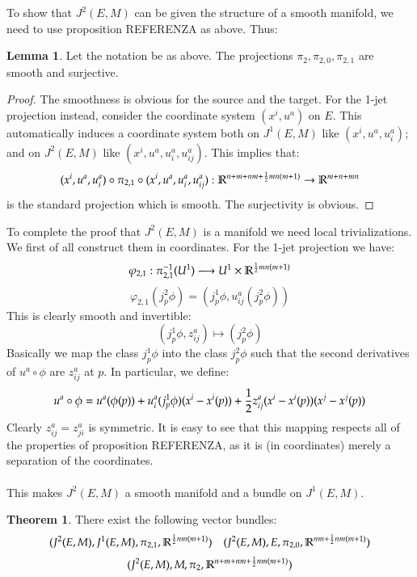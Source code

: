 \documentclass[12pt,a4paper]{report}
\theoremstyle{definition}
\theoremstyle{Theorem}
\newtheorem{Theo}[Def]{Theorem}
\newtheorem{Lm}[Def]{Lemma}
\theoremstyle{break}
\theoremstyle{definition}
\begin{document}
	To show that $J^2(E,M)$ can be given the structure of a smooth manifold, we need to use proposition REFERENZA as above. Thus:
	\begin{Lm}
		Let the notation be as above. The projections $\pi_2,\pi_{2,0},\pi_{2,1}$ are smooth and surjective.
	\end{Lm}
	\begin{proof}
		The smoothness is obvious for the source and the target. For the 1-jet projection instead, consider the coordinate system $(x^i,u^a)$ on $E$. This automatically induces a coordinate system both on $J^1(E,M)$ like $(x^i,u^a,u^a_i)$; and on $J^2(E,M)$ like $(x^i,u^a,u^a_i,u^a_{ij})$. This implies that:
		$$(x^i,u^a,u^a_i)\circ \pi_{2,1}\circ (x^i,u^a,u^a_i,u^a_{ij}):\mathbb{R}^{n+m+nm+{1\over 2}mn(m+1)}\rightarrow\mathbb{R}^{m+n+mn}$$
		is the standard projection which is smooth. The surjectivity is obvious.
	\end{proof}
	To complete the proof that $J^2(E,M)$ is a manifold we need local trivializations. We first of all construct them in coordinates. For the 1-jet projection we have:
	$$\varphi_{2,1}:\pi_{2,1}^{-1}(U^1)\longrightarrow U^1\times \mathbb{R}^{{1\over 2}mn(m+1)}$$
	$$\varphi_{2,1}(j^2_p\phi)=(j^1_p\phi,u^a_{ij}(j^2_p\phi))$$
	This is clearly smooth and invertible:
	$$(j^1_p\phi,z^a_{ij})\mapsto(j^2_p\phi)$$
	Basically we map the class $j^1_p\phi$ into the class $j^2_p\phi$ such that the second derivatives of $u^a\circ \phi$ are $z^a_{ij}$ at $p$. In particular, we define:
	$$u^a\circ\phi=u^a(\phi(p))+u^a_i(j^1_p\phi)(x^i-x^i(p))+{1\over 2}z_{ij}^a(x^i-x^i(p))(x^j-x^j(p))$$
	Clearly $z_{ij}^a=z^a_{ji}$ is symmetric. It is easy to see that this mapping respects all of the properties of proposition REFERENZA, as it is (in coordinates) merely a separation of the coordinates.\\
	\\
	This makes $J^2(E,M)$ a smooth manifold and a bundle on $J^1(E,M)$. 
	\begin{Theo}
		There exist the following vector bundles:
		$$(J^2(E,M),J^1(E,M),\pi_{2,1},\mathbb{R}^{{1\over 2}nm(m+1)})\hspace{10 pt}(J^2(E,M),E,\pi_{2,0},\mathbb{R}^{nm+{1\over 2}nm(m+1)})$$
		$$\hspace{10 pt}(J^2(E,M),M,\pi_{2},\mathbb{R}^{n+m+nm+{1\over 2}nm(m+1)})\hspace{10 pt}$$
	\end{Theo}
\end{document}
